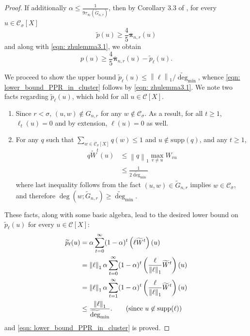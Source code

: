 \documentclass[11pt,twoside]{article}
\newcommand{\norm}[1]{\left\lVert#1\right\rVert}
\newcommand{\1}{\mathbf{1}}
\newcommand{\pbf}{p}        %
\newcommand{\pibf}{\bm{\pi}}
\newcommand{\Xbf}{X}             %
\newcommand{\Wbf}{W}
\newcommand{\Cset}{\mathcal{C}}
\newcommand{\Csig}{\Cset_{\sigma}}
\newcommand{\degminwt}{\widetilde{\deg}_{\min}}
\begin{document}
\begin{proof}
	If additionally $\alpha \leq \frac{1}{9\tau_{\infty}(\widetilde{G}_{n,r})}$, then by Corollary 3.3 of \citep{zhu2013}, for every $u \in \Csig[\Xbf]$
	\begin{equation*}
	\widetilde{\pbf}(u) \geq \frac{4}{5} \overline{\pibf}_{n,r}(u)
	\end{equation*}
	and along with \eqref{eqn: zhulemma3.1}, we obtain
	\begin{equation*}
	\pbf(u) \geq \frac{4}{5} \overline{\pibf}_{n,r}(u) - \widetilde{\pbf}_{\ell}(u).
	\end{equation*}
	
	We proceed to show the upper bound $\widetilde{\pbf}_{\ell}(u) \leq \norm{\ell}_1 / \degminwt$, whence \eqref{eqn: lower_bound_PPR_in_cluster} follows by \eqref{eqn: zhulemma3.1}. We note two facts regarding $\widetilde{\pbf}_{\ell}(u)$, which hold for all $u \in \Cset[\Xbf]$. 
	\begin{enumerate}
		\item Since $r < \sigma$, $(u,w) \not\in G_{n,r}$ for any $w \not\in \Csig$. As a result, for all $t \geq 1$, $\ell_t(u) = 0$ and by extension, $\ell(u) = 0$ as well.
		\item For any $q$ such that $\sum_{w \in \Csig[\Xbf]} q(w) \leq 1$ and $u \not\in \mathrm{supp}(q)$, and any $t \geq 1$,
		\begin{align}
		\label{eqn: one_step_bound}
		q \widetilde{\Wbf}^t (u) & \leq \norm{q}_1 \max_{v \neq u} W_{vu} \nonumber \\
		& \leq \frac{1}{2\degminwt} 
		\end{align}
		where last inequality follows from the fact $(u,w) \in \widetilde{G}_{n,r}$ implies $w \in \Csig$, and therefore $\deg(w; \widetilde{G}_{n,r}) \geq \degminwt$.
	\end{enumerate}
	
	These facts, along with some basic algebra, lead to the desired lower bound on $\widetilde{\pbf}_{\ell}(u)$ for every $u \in \Cset[\Xbf]$:
	\begin{align*}
	\widetilde{\pbf}_{\ell}(u) & = \alpha \sum_{t = 0}^{\infty} (1 - \alpha)^t \left(\ell \widetilde{\Wbf}^t \right)(u)  \nonumber \\
	& = \norm{\ell}_1 \alpha \sum_{t = 0}^{\infty} (1 - \alpha)^t \left(\frac{\ell}{\norm{\ell}_1}  \widetilde{\Wbf}^t \right)(u)\nonumber \\
	& = \norm{\ell}_1 \alpha \sum_{t = 1}^{\infty} (1 - \alpha)^t \left(\frac{\ell}{\norm{\ell}_1}  \widetilde{\Wbf}^t \right)(u)\nonumber \\
	& \leq \frac{\norm{\ell}_1 }{\degminwt}. \tag{since $u \not\in \mathrm{supp}(\ell)$}
	\end{align*}
	and \eqref{eqn: lower_bound_PPR_in_cluster} is proved.
	

\end{proof}
\end{document}
